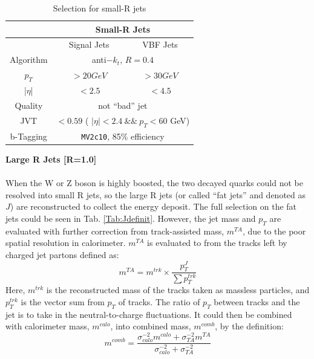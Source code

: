 \begin{table}[tbh]
	\caption{Selection for small-R jets}\label{tab:sjdefinit}
	\vspace{2.0em}
	\centering
	\begin{tabular}{|c||c|c|}
		\hline
		             & \multicolumn{2}{|c|}{ Small-R Jets }\\
		\hline
		             & Signal Jets & VBF Jets \\
		\hline
		Algorithm    & \multicolumn{2}{|c|}{ anti$-k_t$, $R=0.4$}\\
		\hline
		$p_T$        & $>20GeV$ & $>30GeV$\\
		\hline
		|$\eta$|     & $< 2.5$ & $<4.5$  \\
		\hline
		Quality      & \multicolumn{2}{|c|}{not ``bad'' jet}\\
		\hline
		JVT          & \multicolumn{2}{|c|}{$< 0.59$ ( $| \eta | < 2.4 ~ \& \& ~p_T < 60 $ GeV)} \\
		\hline
		b-Tagging    & \multicolumn{2}{|c|}{\texttt{MV2c10}, 85\% efficiency} \\
		\hline
	\end{tabular}
\end{table}
\noindent
{\bf Large R Jets [R=1.0]}
\\
\\When the W or Z boson is highly boosted, the two decayed quarks could not be resolved into small R jets, so the large R jets (or called ``fat jets'' and denoted as $J$) are reconstructed to collect the energy deposit. The full selection on the fat jets could be seen in Tab. \ref{Tab:Jdefinit}. However, the jet mass and $p_{T}$ are evaluated with further correction from track-assisted mass, $m^{TA}$, due to the poor spatial resolution in calorimeter. $m^{TA}$ is evaluated to from the tracks left by charged jet partons defined as:
\begin{equation}
m^{TA} = m^{trk} \times \frac{p_{T}^{J}}{\sum p_{T}^{trk}}
\end{equation}  
Here, $m^{trk}$ is the reconstructed mass of the tracks taken as massless particles, and $p_{T}^{trk}$ is the vector sum from $p_{T}$ of tracks.  The ratio of $p_{T}$ between tracks and the jet is to take in the neutral-to-charge fluctuations. It could then be combined with calorimeter mass, $m^{calo}$, into combined mass, $m^{comb}$, by the definition:
\begin{equation}
m^{comb} = \frac{\sigma_{{calo}}^{-2} m^{{calo}} + \sigma_{{TA}}^{-2} m^{{TA}} }{\sigma_{{calo}}^{-2} + \sigma_{{TA}}^{-2}}
\end{equation}
